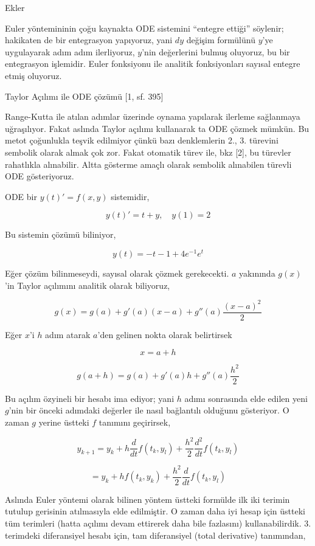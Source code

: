 \documentclass[12pt,fleqn]{article}\usepackage{../../common}
\begin{document}
Ekler

Euler yöntemininin çoğu kaynakta ODE sistemini ``entegre ettiği'' söylenir;
hakikaten de bir entegrasyon yapıyoruz, yani $dy$ değişim formülünü $y$'ye
uygulayarak adım adım ilerliyoruz, $y$'nin değerlerini bulmuş oluyoruz, bu
bir entegrasyon işlemidir. Euler fonksiyonu ile analitik fonksiyonları
sayısal entegre etmiş oluyoruz.

Taylor Açılımı ile ODE çözümü [1, sf. 395]

Range-Kutta ile atılan adımlar üzerinde oynama yapılarak ilerleme
sağlanmaya uğraşılıyor. Fakat aslında Taylor açılımı kullanarak ta ODE
çözmek mümkün. Bu metot çoğunlukla teşvik edilmiyor çünkü bazı denklemlerin
2., 3. türevini sembolik olarak almak çok zor. Fakat otomatik türev ile,
bkz [2], bu türevler rahatlıkla alınabilir. Altta gösterme amaçlı olarak
sembolik alınabilen türevli ODE gösteriyoruz.

ODE bir $y(t)' = f(x,y)$ sistemidir, 

$$ y(t)' = t + y , \quad y(1) = 2$$

Bu sistemin çözümü biliniyor, 

$$ y(t) = -t -1 + 4e^{-1}e^t$$

Eğer çözüm bilinmeseydi, sayısal olarak çözmek gerekecekti. $a$ yakınında
$g(x)$'in Taylor açılımını analitik olarak biliyoruz,

$$ g(x) = g(a) + g'(a)(x-a) + g''(a) \frac{(x-a)^2}{2}$$

Eğer $x$'i $h$ adım atarak $a$'den gelinen nokta olarak belirtirsek

$$ x=a+h$$

$$ g(a+h) = g(a) + g'(a)h + g''(a)\frac{h^2}{2}$$

Bu açılım özyineli bir hesabı ima ediyor; yani $h$ adımı sonrasında elde
edilen yeni $g$'nin bir önceki adımdaki değerler ile nasıl bağlantılı
olduğunu gösteriyor. O zaman $g$ yerine üstteki $f$ tanımını geçirirsek,

$$ y_{k+1} = y_k + h \frac{d}{dt} f(t_k,y_l) + \frac{h^2}{2} \frac{d^2}{dt} f(t_k,y_l)$$

$$  = y_k + hf(t_k,y_k) + \frac{h^2}{2} \frac{d}{dt} f(t_k,y_l)$$

Aslında Euler yöntemi olarak bilinen yöntem üstteki formülde ilk iki
terimin tutulup gerisinin atılmasıyla elde edilmiştir. O zaman daha iyi
hesap için üstteki tüm terimleri (hatta açılımı devam ettirerek daha bile
fazlasını) kullanabilirdik. 3. terimdeki diferansiyel hesabı için, tam
diferansiyel (total derivative) tanımından,
\end{document}
